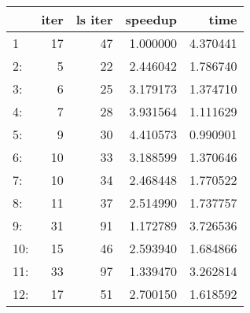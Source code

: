 \begin{tabular}{lrrrr}
\toprule
{} &  iter &  ls iter &   speedup &      time \\
\midrule
1   &    17 &       47 &  1.000000 &  4.370441 \\
2:  &     5 &       22 &  2.446042 &  1.786740 \\
3:  &     6 &       25 &  3.179173 &  1.374710 \\
4:  &     7 &       28 &  3.931564 &  1.111629 \\
5:  &     9 &       30 &  4.410573 &  0.990901 \\
6:  &    10 &       33 &  3.188599 &  1.370646 \\
7:  &    10 &       34 &  2.468448 &  1.770522 \\
8:  &    11 &       37 &  2.514990 &  1.737757 \\
9:  &    31 &       91 &  1.172789 &  3.726536 \\
10: &    15 &       46 &  2.593940 &  1.684866 \\
11: &    33 &       97 &  1.339470 &  3.262814 \\
12: &    17 &       51 &  2.700150 &  1.618592 \\
\bottomrule
\end{tabular}
